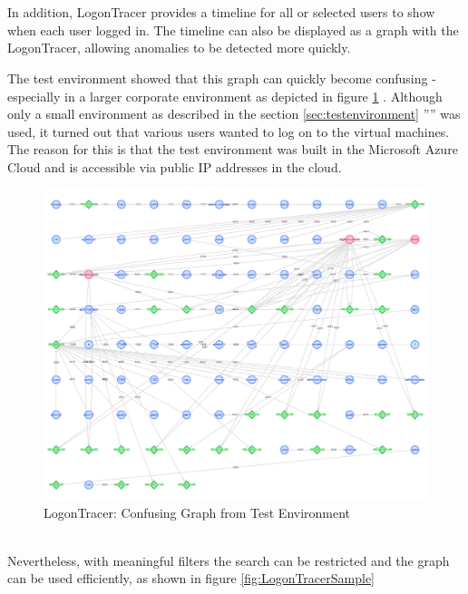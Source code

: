 \\\\
In addition, LogonTracer provides a timeline for all or selected users to show when each user logged in. The timeline can also be displayed as a graph with the LogonTracer, allowing anomalies to be detected more quickly.

\clearpage

The test environment showed that this graph can quickly become confusing - especially in a larger corporate environment as depicted in figure \ref{fig:LogonTraceerConfusing} . Although only a small environment as described in the section \ref{sec:testenvironment} '''' was used, it turned out that various users wanted to log on to the virtual machines. The reason for this is that the test environment was built in the Microsoft Azure Cloud and is accessible via public IP addresses in the cloud.

\begin{figure}[H]
    \centering
    \includegraphics[width=0.8\linewidth]{assets/LogonTracer/logontracer_confusing.png}
    \caption{LogonTracer: Confusing Graph from Test Environment}
    \label{fig:LogonTraceerConfusing}
\end{figure} \ \\
Nevertheless, with meaningful filters the search can be restricted and the graph can be used efficiently, as shown in figure \ref{fig:LogonTracerSample} 

\clearpage

